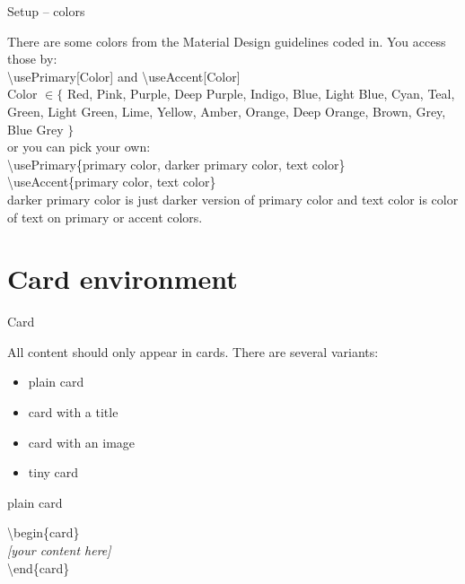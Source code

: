 \documentclass[aspectratio=43]{beamer}
\begin{document}

\begin{frame}{Setup -- colors}
\begin{card}
There are some colors from the Material Design guidelines coded in. You access those by: \\[2mm]
{\color{primary} \textbackslash usePrimary[Color]} and {\color{primary}\textbackslash useAccent[Color]}\\[2mm]
{\tiny {\color{primary}Color} $\in \{$ Red, Pink, Purple, Deep Purple, Indigo, Blue, Light Blue, Cyan, Teal, Green, Light Green, Lime, Yellow, Amber, Orange, Deep Orange, Brown, Grey, Blue Grey $\}$} \\[2mm]
or you can pick your own:\\[2mm]
{\color{primary} \textbackslash usePrimary\{primary color, darker primary color, text color\}}
{\color{primary} \textbackslash useAccent\{primary color, text color\}}\\[2mm]
{\color{primary} darker primary color} is just darker version of {\color{primary} primary color} and {\color{primary} text color} is color of text on {\color{primary} primary} or {\color{primary} accent colors}.
\end{card}
\end{frame}


\section{Card environment}
\begin{frame}{Card}
\begin{card}
All content should only appear in cards. There are several variants:
\begin{itemize}
\item plain card
\item card with a title
\item card with an image
\item tiny card
\end{itemize}
\end{card}
\end{frame}


\begin{frame}{plain card}
\begin{card}
\end{card}

\begin{card}
{\color{primary} \textbackslash begin\{card\}\\[2mm]}
\null\qquad \textit{[your content here]}\\[2mm]
{\color{primary} \textbackslash end\{card\}}
\end{card}
\end{frame}
\end{document}
